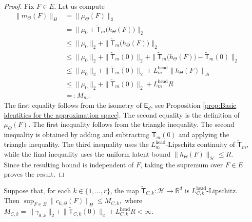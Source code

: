 \begin{proof}
Fix \(F\in E\). Let us compute
\[
\begin{aligned}
\|m_\Theta(F)\|_H
&=
\|\mu_\Theta(F)\|_2\\
&=
\|
\mu_0
+
\widetilde{\mathsf T}_m
\bigl(h_\Theta(F)\bigr)
\|_2\\
&\leqslant
\|\mu_0\|_2
+
\|
\widetilde{\mathsf T}_m
\bigl(h_\Theta(F)\bigr)
\|_2\\
&\leqslant
\|\mu_0\|_2
+
\|\widetilde{\mathsf T}_m(0)\|_2
+
\|
\widetilde{\mathsf T}_m
\bigl(h_\Theta(F)\bigr)
-
\widetilde{\mathsf T}_m(0)
\|_2
\\
&\leqslant
\|\mu_0\|_2
+
\|\widetilde{\mathsf T}_m(0)\|_2
+
L_m^{\mathrm{head}}
\|h_\Theta(F)\|_{\mathcal H}
\\
&\leqslant
\|\mu_0\|_2
+
\|\widetilde{\mathsf T}_m(0)\|_2
+
L_m^{\mathrm{head}}R
\\
&=:
M_m.
\end{aligned}
\]
The first equality follows from the isometry of \(\mathsf E_d\), see Proposition \ref{prop:Basic identities for the approximation space}. The second equality is the definition of \(\mu_\Theta(F)\). The first inequality follows from the triangle inequality. The second inequality is obtained by adding and subtracting \(\widetilde{\mathsf T}_m(0)\) and applying the triangle inequality. The third inequality uses the \(L_m^{\mathrm{head}}\)-Lipschitz continuity of \(\widetilde{\mathsf T}_m\), while the final inequality uses the uniform latent bound \(\|h_\Theta(F)\|_{\mathcal H}\leqslant R\). Since the resulting bound is independent of \(F\), taking the supremum over \(F\in E\) proves the result.
\end{proof}

\begin{proposition}
\label{prop:Uniform bounds for covariance factors}
Suppose that, for each \(k\in\{1,\ldots,r\}\), the map \(\widetilde{\mathsf T}_{C,k}:\mathcal H\to\mathbb R^d\) is \(L_{C,k}^{\mathrm{head}}\)-Lipschitz. Then
\(
\sup_{F\in E}
\|c_{k,\Theta}(F)\|_H
\leqslant
M_{C,k},
\)
where
\(
M_{C,k}
=
\|\gamma_{0,k}\|_2
+
\|\widetilde{\mathsf T}_{C,k}(0)\|_2
+
L_{C,k}^{\mathrm{head}}R
<\infty.
\)
\end{proposition}

